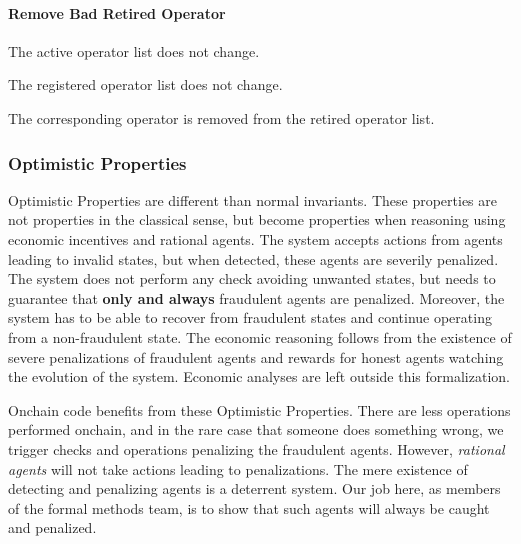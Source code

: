 \paragraph*{Remove Bad Retired Operator}
\begin{theorem}
  \leanok
  \label{thm:OperatorDirectory.Properties.Actions.retired_remove_same_active}
  The active operator list does not change.
  \end{theorem}
\begin{theorem}
  \leanok
  \label{thm:OperatorDirectory.Properties.Actions.retired_remove_same_registered}
  The registered operator list does not change.
  \end{theorem}
\begin{theorem}
  \leanok
  \label{thm:OperatorDirectory.Properties.Actions.retired_remove_retired}
  The corresponding operator is removed from the retired operator list.
  \end{theorem}


\subsubsection{Optimistic Properties}\label{sec:opdir:optimisticprops}
%
Optimistic Properties are different than normal invariants.
%
These properties are not properties in the classical sense,
but become properties when reasoning using economic incentives and rational agents.
%
The system accepts actions from agents leading to invalid states, but when
detected, these agents are severily penalized.
%
The system does not perform any check avoiding unwanted states, but needs to
guarantee that \textbf{only and always} fraudulent agents are penalized.
%
Moreover, the system has to be able to recover from fraudulent states and
continue operating from a non-fraudulent state.
%
The economic reasoning follows from the existence of severe penalizations of
fraudulent agents and rewards for honest agents watching the evolution of the
system.
%
Economic analyses are left outside this formalization.

Onchain code benefits from these Optimistic Properties.
%
There are less operations performed onchain, and in the rare case that someone
does something wrong, we trigger checks and operations penalizing the
fraudulent agents.
%
However, \emph{rational agents} will not take actions leading to penalizations.
%
The mere existence of detecting and penalizing agents is a deterrent system.
%
Our job here, as members of the formal methods team, is to show that such agents
will always be caught and penalized.

